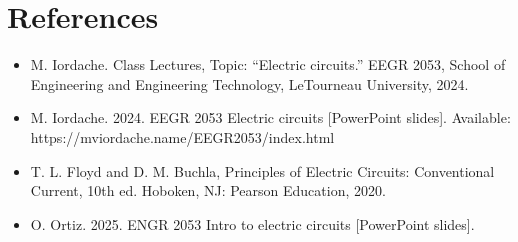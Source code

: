 \documentclass{article}
\begin{document}
\newpage
\section*{References}
\begin{itemize}
\item M. Iordache. Class Lectures, Topic: ``Electric circuits.'' EEGR 2053, School of Engineering and Engineering Technology, LeTourneau University, 2024.
\item M. Iordache. 2024. EEGR 2053 Electric circuits [PowerPoint slides]. Available: \\ https://mviordache.name/EEGR2053/index.html
\item T. L. Floyd and D. M. Buchla, Principles of Electric Circuits: Conventional Current, 10th ed. Hoboken, NJ: Pearson Education, 2020.
\item O. Ortiz. 2025. ENGR 2053 Intro to electric circuits [PowerPoint slides].
\end{itemize}
\end{document}
